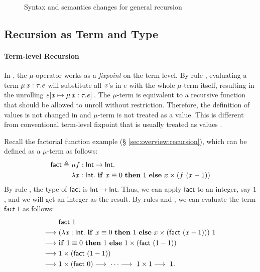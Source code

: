 \begin{figure}
	\gram{\newsyntax}\ottinterrule
	\ottdefnstepXXrec{}\ottinterrule
	\ottdefnexprXXrec{}
	\caption{Syntax and semantics changes for general recursion}
    \label{fig:rec:ext}
\end{figure}

\subsection{Recursion as Term and Type}
\label{subsec:recur}
\paragraph{Term-level Recursion}

In \name, the $ \mu $-operator works as a \emph{fixpoint} on the term
level. By rule , evaluating a term $\mu \, \mathit{x}  :  \tau  .  \mathit{e}$ will
substitute all $\mathit{x}$'s in $e$ with the whole $ \mu $-term itself,
resulting in the unrolling $\mathit{e}  [  \mathit{x}  \mapsto  \mu \, \mathit{x}  :  \tau  .  \mathit{e}  ] \,$. The
$ \mu $-term is equivalent to a recursive function that should be
allowed to unroll without restriction. Therefore, the definition of
values is not changed in \name and $ \mu $-term is not treated as a
value. This is different from conventional term-level fixpoint that is
usually treated as values \cite{zombie:popl14}.

Recall the factorial function example (\S
\ref{sec:overview:recursion}), which can be defined as a $ \mu $-term
as follows:
\begin{align*}
    \mathsf{fact}  \triangleq ~  & \mu  f : \mathsf{Int}  \rightarrow  \mathsf{Int} . \\ &\lambda  \mathit{x}  :  \mathsf{Int}  .  ~\mathbf{if}~x  \equiv 0~\mathbf{then}~1~\mathbf{else}~x \times (f~(x
    - 1))
\end{align*}
By rule , the type of $\mathsf{fact}$ is $\mathsf{Int}  \rightarrow  \mathsf{Int}$. Thus, we can apply $\mathsf{fact}$ to an integer, say $1$, and
we will get an integer as the result.  By rules  and
, we can evaluate the term $\mathsf{fact}~1$ as follows:
\begin{align*}
    &\mathsf{fact}~1 \\  \longrightarrow ~& (\lambda  \mathit{x}  :  \mathsf{Int}  .  ~\mathbf{if}~x
   \equiv 0~\mathbf{then}~1~\mathbf{else}~x \times (\mathsf{fact}~(x - 1)))~1
  \\  \longrightarrow ~ & \mathbf{if}~1  \equiv 0~\mathbf{then}~1~\mathbf{else}~1 \times
  (\mathsf{fact}~(1 - 1)) \\  \longrightarrow ~& 1 \times (\mathsf{fact}~(1-1))
  \\  \longrightarrow ~& 1 \times (\mathsf{fact}~0)  \longrightarrow ~ \dots  \longrightarrow ~ 1 \times
  1  \longrightarrow ~ 1. 
\end{align*}

